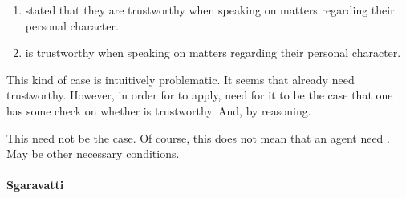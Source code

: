 \begin{note}[Testimony 1]
  \begin{illustration}[Testimony 1]
    \label{illu:CS:test:basic}
    \mbox{}
    \begin{enumerate}[label=\arabic*., ref=(\arabic*)]
    \item
      \label{ex:eiS:t:basic:test}
       stated that they are trustworthy when speaking on matters regarding their personal character.
    \item
      \label{ex:eiS:t:basic:ok}
       is trustworthy when speaking on matters regarding their personal character.
    \end{enumerate}
  \end{illustration}
  This kind of case is intuitively problematic.
  It seems that already need trustworthy.
  However, in order for \csN{} to apply, need for it to be the case that one has some check on whether  is trustworthy.
  And, by reasoning.

  This need not be the case.
  Of course, this does not mean that an agent need \csN{}.
  May be other necessary conditions.
\end{note}

\paragraph{Sgaravatti}

